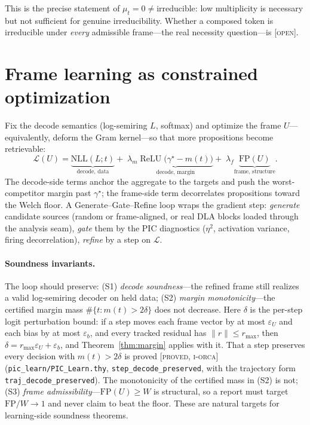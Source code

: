 \documentclass[11pt]{article}
\theoremstyle{definition}
\theoremstyle{plain}
\theoremstyle{remark}
\newcommand{\proved}{\textsc{[proved, i-orca]}}
\newcommand{\open}{\textsc{[open]}}
\begin{document}
This is the precise statement of $\mu_t=0\neq\text{irreducible}$: low multiplicity is necessary but not
sufficient for genuine irreducibility. Whether a composed token is irreducible under \emph{every}
admissible frame---the real necessity question---is \open{}.

\section{Frame learning as constrained optimization}\label{sec:learn}

Fix the decode semantics (log-semiring $L$, softmax) and optimize the frame $U$---equivalently, deform
the Gram kernel---so that more propositions become retrievable:
\[
  \mathcal{L}(U)=\underbrace{\mathrm{NLL}(L;t)}_{\text{decode, data}}
  +\;\lambda_m\underbrace{\operatorname{ReLU}\!\bigl(\gamma^\star-m(t)\bigr)}_{\text{decode, margin}}
  +\;\lambda_f\underbrace{\mathrm{FP}(U)}_{\text{frame, structure}} .
\]
The decode-side terms anchor the aggregate to the targets and push the worst-competitor margin past
$\gamma^\star$; the frame-side term decorrelates propositions toward the Welch floor. A
Generate--Gate--Refine loop wraps the gradient step: \emph{generate} candidate sources (random or
frame-aligned, or real DLA blocks loaded through the analysis seam), \emph{gate} them by the PIC
diagnostics ($\eta^2$, activation variance, firing decorrelation), \emph{refine} by a step on
$\mathcal{L}$.

\paragraph{Soundness invariants.} The loop should preserve: (S1) \emph{decode soundness}---the refined
frame still realizes a valid log-semiring decoder on held data; (S2) \emph{margin monotonicity}---the
certified margin mass $\#\{t:m(t)>2\delta\}$ does not decrease. Here $\delta$ is the per-step logit
perturbation bound: if a step moves each frame vector by at most $\varepsilon_U$ and each bias by at most
$\varepsilon_b$, and every tracked residual has $\lVert r\rVert\le r_{\max}$, then
$\delta=r_{\max}\varepsilon_U+\varepsilon_b$, and Theorem~\ref{thm:margin} applies with it. That a step
preserves every decision with $m(t)>2\delta$ is proved \proved{} (\texttt{pic\_learn/PIC\_Learn.thy},
\texttt{step\_decode\_preserved}, with the trajectory form \texttt{traj\_decode\_preserved}). The
monotonicity of the certified mass in (S2) is not; (S3)
\emph{frame admissibility}---$\mathrm{FP}(U)\ge W$ is structural, so a report must target $\mathrm{FP}/W\to1$
and never claim to beat the floor. These are natural targets for learning-side soundness theorems.
\end{document}
